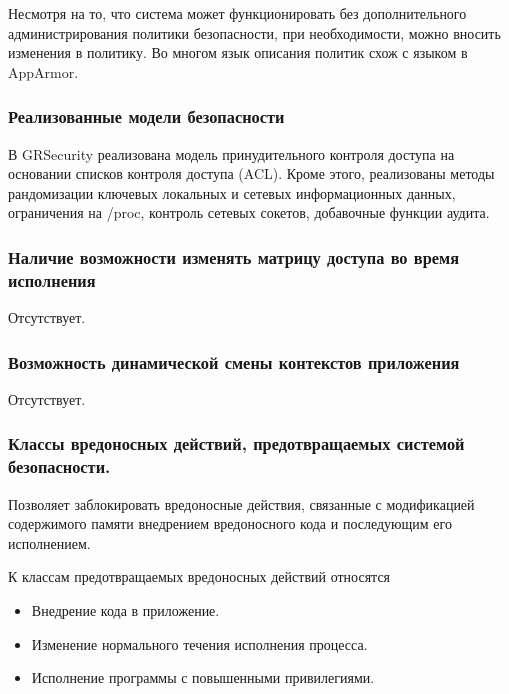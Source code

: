 Несмотря на то, что система может функционировать 
без дополнительного администрирования политики 
безопасности, при необходимости, можно вносить 
изменения в политику. Во многом язык описания 
политик схож с языком в AppArmor. 

\subsubsection{Реализованные модели безопасности} 

В GRSecurity реализована модель принудительного контроля 
доступа на основании списков контроля доступа (ACL).
Кроме этого, реализованы методы рандомизации ключевых 
локальных и сетевых информационных данных, 
ограничения на /proc, контроль сетевых сокетов, 
добавочные функции аудита.   

\subsubsection{Наличие возможности изменять матрицу доступа во время 
	исполнения} 

Отсутствует.

\subsubsection{Возможность динамической смены контекстов приложения} 

Отсутствует. 

\subsubsection{Классы вредоносных действий, предотвращаемых 
	системой безопасности.} 

Позволяет заблокировать вредоносные действия, связанные 
с модификацией содержимого памяти внедрением вредоносного 
кода и последующим его исполнением. 

К классам предотвращаемых вредоносных действий относятся 
\begin{itemize} 
\item Внедрение кода в приложение. 
\item Изменение нормального течения исполнения процесса. 
\item Исполнение программы с повышенными привилегиями. 
\end{itemize} 


